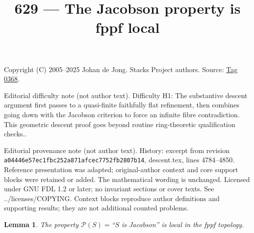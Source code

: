 \documentclass{amsart}
\theoremstyle{plain}
\newtheorem{lemma}[subsection]{Lemma}
\theoremstyle{definition}
\theoremstyle{remark}
\numberwithin{equation}{subsection}
\begin{document}
\title[Stacks Project, Tag 0368]{629 --- The Jacobson property is fppf local}
\maketitle
\noindent Copyright (C) 2005--2025 Johan de Jong. Stacks Project authors. Source: \href{https://stacks.math.columbia.edu/tag/0368}{Tag 0368}.

\noindent Editorial difficulty note (not author text). Difficulty H1: The substantive descent argument first passes to a quasi-finite faithfully flat refinement, then combines going down with the Jacobson criterion to force an infinite fibre contradiction. This geometric descent proof goes beyond routine ring-theoretic qualification checks..

\noindent Editorial provenance note (not author text). History: excerpt from revision \texttt{a0444\allowbreak 6e57e\allowbreak c1fbc\allowbreak 252a8\allowbreak 71afc\allowbreak ec775\allowbreak 2fb28\allowbreak 07b14}, descent.tex, lines 4784--4850. Reference presentation was adapted; original-author context and core support blocks were retained or added. The mathematical wording is unchanged. Licensed under GNU FDL 1.2 or later; no invariant sections or cover texts. See ../licenses/COPYING. Context blocks reproduce author definitions and supporting results; they are not additional counted problems.

\begin{lemma}
\label{lemma-Jacobson-local-fppf}
The property $\mathcal{P}(S) =$``$S$ is Jacobson'' is local
in the fppf topology.
\end{lemma}
\end{document}
